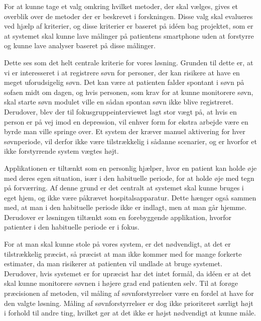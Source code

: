 For at kunne tage et valg omkring hvilket metoder, der skal vælges, gives et overblik over de metoder der er beskrevet i forskningen.
Disse valg skal evalueres ved hjælp af kriterier, og disse kriterier er baseret på idéen bag projektet, som er at systemet skal kunne lave målinger på patientens smartphone uden at forstyrre og kunne lave analyser baseret på disse målinger. 

\begin{description}[style=nextline]
\item[Kriterie \#1: Undgå brugerintervention og måle søvn uden at forstyrre]
Dette ses som det helt centrale kriterie for vores løsning.
Grunden til dette er, at vi er interesseret i at registrere søvn for personer, der kan risikere at have en meget uforudsigelig søvn. 
Det kan være at patienten falder spontant i søvn på sofaen midt om dagen, og hvis personen, som krav for at kunne monitorere søvn, skal starte søvn modulet ville en sådan spontan søvn ikke blive registreret.
Derudover, blev der til fokusgruppeinterviewet \citep[Kapitel 1, Sektion 5]{misc:faellesrapp}  lagt stor vægt på, at hvis en person er på vej imod en depression, vil enhver form for ekstra arbejde være en byrde man ville springe over.
Et system der kræver manuel aktivering for hver søvnperiode, vil derfor ikke være tilstrækkelig i sådanne scenarier, og er hvorfor et ikke forstyrrende system vægtes højt.

\item[Kriterie \#2: Kunne bruges af patienter i deres eget hjem]
Applikationen er tiltænkt som en personlig hjælper, hvor en patient kan holde øje med deres egen situation, især i den habituelle periode, for at holde øje med tegn på forværring.
Af denne grund er det centralt at systemet skal kunne bruges i eget hjem, og ikke være påkrævet hospitalsapparatur.
Dette hænger også sammen med, at man i den habituelle periode ikke er indlagt, men at man går hjemme.
Derudover er løsningen tiltænkt som en forebyggende applikation, hvorfor patienter i den habituelle periode er i fokus.

\item[Kriterie \#3: Være præcis]
For at man skal kunne stole på vores system, er det nødvendigt, at det er tilstrækkelig præcist, så præcist at man ikke kommer med for mange forkerte estimater, da man risikerer at patienten vil undlade at bruge systemet. 
Derudover, hvis systemet er for upræcist har det intet formål, da idéen er at det skal kunne monitorere søvnen i højere grad end patienten selv.
Til at forøge præcisionen af metoden, vil måling af søvnforstyrrelser være en fordel at have for den valgte løsning.
Måling af søvnforstyrrelser er dog ikke prioriteret særligt højt i forhold til andre ting, hvilket gør at det ikke er højst nødvendigt at kunne måle.
\end{description}

